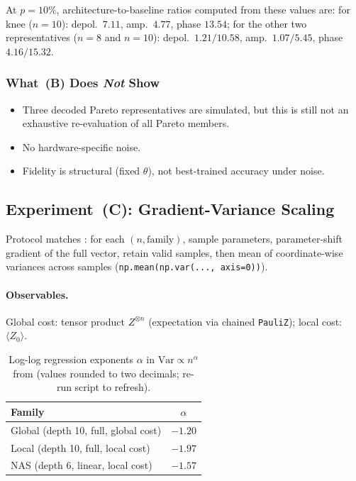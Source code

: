\noindent
At $p=10\%$, architecture-to-baseline ratios computed from these values are:
for knee ($n=10$): depol.\ $7.11$, amp.\ $4.77$, phase $13.54$; for the other
two representatives ($n=8$ and $n=10$): depol.\ $1.21/10.58$, amp.\ $1.07/5.45$,
phase $4.16/15.32$.

\subsubsection{What~(B) Does \emph{Not} Show}

\begin{itemize}
  \item Three decoded Pareto representatives are simulated, but this is still not
        an exhaustive re-evaluation of all Pareto members.
  \item No hardware-specific noise.
  \item Fidelity is structural (fixed $\theta$), not best-trained accuracy under noise.
\end{itemize}

\subsection{Experiment~(C): Gradient-Variance Scaling}\label{ssec:grad}

Protocol matches :
for each $(n,\text{family})$, sample parameters, parameter-shift gradient of the
full vector, retain valid samples, then mean of coordinate-wise variances
across samples (\texttt{np.mean(np.var(...,\,axis=0))}).

\paragraph{Observables.}
Global cost: tensor product $Z^{\otimes n}$ (expectation via chained
\texttt{PauliZ}); local cost: $\langle Z_0\rangle$.

\begin{table}[t]
  \centering
  \caption{Log-log regression exponents $\alpha$ in
           $\mathrm{Var}\propto n^{\alpha}$ from
           (values rounded to two decimals; re-run script to refresh).}
  \label{tab:grad_exponents}
  \begin{tabular}{lc}
    \toprule
    Family & $\alpha$ \\
    \midrule
    Global (depth 10, full, global cost) & $-1.20$ \\
    Local (depth 10, full, local cost)  & $-1.97$ \\
    NAS (depth 6, linear, local cost)   & $-1.57$ \\
    \bottomrule
  \end{tabular}
\end{table}

